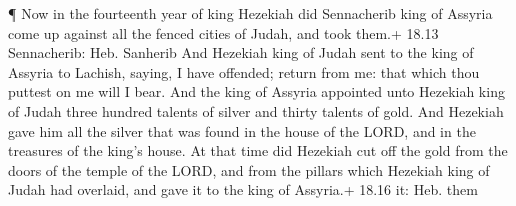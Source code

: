  ¶ Now in the fourteenth year of king Hezekiah did
Sennacherib king of Assyria come up against all the fenced cities of
Judah, and took them.+ 18.13 Sennacherib: Heb. Sanherib 
And Hezekiah king of Judah sent to the king of Assyria to Lachish,
saying, I have offended; return from me: that which thou puttest on me
will I bear. And the king of Assyria appointed unto Hezekiah king of
Judah three hundred talents of silver and thirty talents of gold.
 And Hezekiah gave him all the silver that was found in the
house of the LORD, and in the treasures of the king's house.
 At that time did Hezekiah cut off the gold from the doors
of the temple of the LORD, and from the pillars which Hezekiah king of
Judah had overlaid, and gave it to the king of Assyria.+ 18.16 it: Heb.
them

